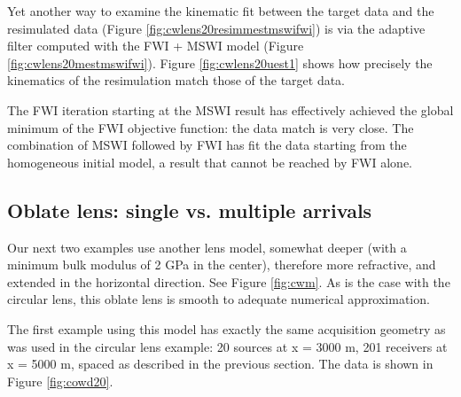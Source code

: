 

Yet another way to examine the kinematic fit between the target data
and the resimulated data (Figure \ref{fig:cwlens20resimmestmswifwi})
is via the adaptive filter computed with the FWI + MSWI model (Figure
\ref{fig:cwlens20mestmswifwi}).  Figure \ref{fig:cwlens20uest1}
shows how precisely the kinematics of the resimulation match those of
the target data.


The FWI iteration starting at the MSWI result has effectively achieved
the global minimum of the FWI objective function: the data match is
very close. The combination of MSWI followed by FWI has fit the data
starting from the homogeneous initial model, a result that cannot be
reached by FWI alone.

\subsection{Oblate lens: single vs. multiple arrivals}

Our next two examples use another lens model, somewhat deeper (with a
minimum bulk modulus of 2 GPa in the center), therefore more
refractive, and extended in the
horizontal direction. See Figure \ref{fig:cwm}. As is the case with
the circular lens, this oblate lens is smooth to adequate numerical
approximation.


The first example using this model has exactly the same acquisition
geometry as was used in the circular lens example: 20 sources at x =
3000 m, 201 receivers at x = 5000 m, spaced as described in the
previous section. The data is shown in Figure \ref{fig:cowd20}. 

